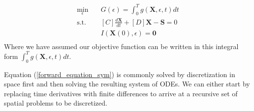 \documentclass{tufte-handout}
\begin{document}
  \begin{equation}
  \begin{aligned}
  \min_{\epsilon} \quad & G(\epsilon) = \int^T_0 g(\mathbf{X},\epsilon,t) dt \\
  \textrm{s.t.} \quad & [C] \frac{d \mathbf{X}}{dt} + [D] \mathbf{X} - \mathbf{S} = 0\\
  &I(\mathbf{X}(0),\epsilon) = \mathbf{0}   \\
  \end{aligned}
  \end{equation}
 Where we have assumed our objective function can be written in this integral form $\int^T_0 g(\mathbf{X},\epsilon,t) dt$. 
 
 Equation (\ref{forward_equation_sym}) is  commonly solved by discretization  in space first and then solving the resulting system of ODEs. We can either start by replacing time derivatives with finite differences  to arrive at a recursive set of spatial problems to be discretized.
\end{document}
